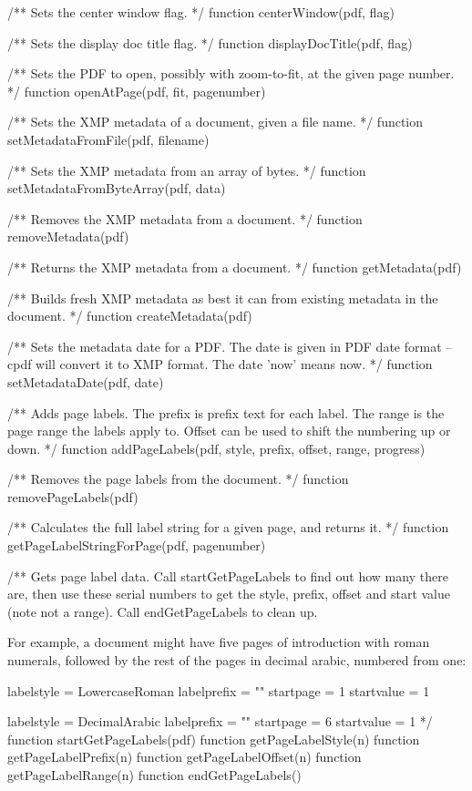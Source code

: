 /** Sets the center window flag. */
function centerWindow(pdf, flag)

/** Sets the display doc title flag. */
function displayDocTitle(pdf, flag)

/** Sets the PDF to open, possibly with zoom-to-fit, at the given page
number. */
function openAtPage(pdf, fit, pagenumber)

/** Sets the XMP metadata of a document, given a file name. */
function setMetadataFromFile(pdf, filename)

/** Sets the XMP metadata from an array of bytes. */
function setMetadataFromByteArray(pdf, data)

/** Removes the XMP metadata from a document. */
function removeMetadata(pdf)

/** Returns the XMP metadata from a document. */
function getMetadata(pdf)

/** Builds fresh XMP metadata as best it can from existing metadata in the
document. */
function createMetadata(pdf)

/** Sets the metadata date for a PDF. The date is given in PDF date format --
cpdf will convert it to XMP format. The date 'now' means now. */
function setMetadataDate(pdf, date)

/** Adds page labels. The prefix is prefix text for each label. The range is
the page range the labels apply to. Offset can be used to shift the numbering
up or down. */
function addPageLabels(pdf, style, prefix, offset, range, progress)

/** Removes the page labels from the document. */
function removePageLabels(pdf)

/** Calculates the full label string for a given page, and returns it. */
function getPageLabelStringForPage(pdf, pagenumber)

/** Gets page label data. Call startGetPageLabels to find out how many
there are, then use these serial numbers to get the style, prefix, offset
and start value (note not a range). Call endGetPageLabels to clean up.

For example, a document might have five pages of introduction with roman
numerals, followed by the rest of the pages in decimal arabic, numbered from
one:

labelstyle = LowercaseRoman
labelprefix = ""
startpage = 1
startvalue = 1

labelstyle = DecimalArabic
labelprefix = ""
startpage = 6
startvalue = 1 */
function startGetPageLabels(pdf)
function getPageLabelStyle(n)
function getPageLabelPrefix(n)
function getPageLabelOffset(n)
function getPageLabelRange(n)
function endGetPageLabels()
